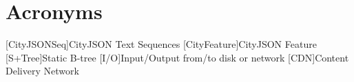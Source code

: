 
\chapter*{Acronyms}

\begin{acronym}[UML]
  [CityJSONSeq]{CityJSON Text Sequences}
  [CityFeature]{CityJSON Feature}
  [S+Tree]{Static B-tree}
  [I/O]{Input/Output from/to disk or network}
  [CDN]{Content Delivery Network}
\end{acronym}